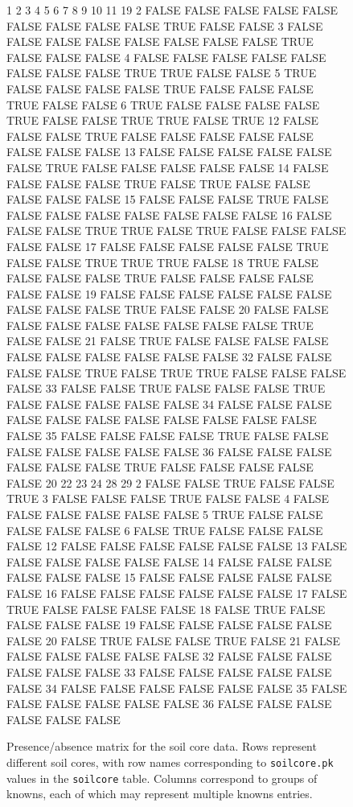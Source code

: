 \documentclass[a4paper]{article}
\newcommand\code\texttt
\begin{document}
\begin{figure}
\begin{Schunk}
\begin{Soutput}
       1     2     3     4     5     6     7     8     9    10    11    19
2  FALSE FALSE FALSE FALSE FALSE FALSE FALSE FALSE FALSE  TRUE FALSE FALSE
3  FALSE FALSE FALSE FALSE FALSE FALSE FALSE FALSE  TRUE FALSE FALSE FALSE
4  FALSE FALSE FALSE FALSE FALSE FALSE FALSE FALSE  TRUE  TRUE FALSE FALSE
5   TRUE FALSE FALSE FALSE FALSE  TRUE FALSE FALSE FALSE  TRUE FALSE FALSE
6   TRUE FALSE FALSE FALSE FALSE  TRUE FALSE FALSE  TRUE  TRUE FALSE  TRUE
12 FALSE FALSE FALSE  TRUE FALSE FALSE FALSE FALSE FALSE FALSE FALSE FALSE
13 FALSE FALSE FALSE FALSE FALSE FALSE  TRUE FALSE FALSE FALSE FALSE FALSE
14 FALSE FALSE FALSE FALSE  TRUE FALSE  TRUE FALSE FALSE FALSE FALSE FALSE
15 FALSE FALSE FALSE  TRUE FALSE FALSE FALSE FALSE FALSE FALSE FALSE FALSE
16 FALSE FALSE FALSE  TRUE  TRUE FALSE  TRUE FALSE FALSE FALSE FALSE FALSE
17 FALSE FALSE FALSE FALSE FALSE  TRUE FALSE FALSE  TRUE  TRUE  TRUE FALSE
18  TRUE FALSE FALSE FALSE FALSE  TRUE FALSE FALSE FALSE FALSE FALSE FALSE
19 FALSE FALSE FALSE FALSE FALSE FALSE FALSE FALSE FALSE  TRUE FALSE FALSE
20 FALSE FALSE FALSE FALSE FALSE FALSE FALSE FALSE FALSE  TRUE FALSE FALSE
21 FALSE  TRUE FALSE FALSE FALSE FALSE FALSE FALSE FALSE FALSE FALSE FALSE
32 FALSE FALSE FALSE FALSE  TRUE FALSE  TRUE  TRUE FALSE FALSE FALSE FALSE
33 FALSE FALSE  TRUE FALSE FALSE FALSE  TRUE FALSE FALSE FALSE FALSE FALSE
34 FALSE FALSE FALSE FALSE FALSE FALSE FALSE FALSE FALSE FALSE FALSE FALSE
35 FALSE FALSE FALSE FALSE  TRUE FALSE FALSE FALSE FALSE FALSE FALSE FALSE
36 FALSE FALSE FALSE FALSE FALSE FALSE  TRUE FALSE FALSE FALSE FALSE FALSE
      20    22    23    24    28    29
2  FALSE FALSE  TRUE FALSE FALSE  TRUE
3  FALSE FALSE FALSE  TRUE FALSE FALSE
4  FALSE FALSE FALSE FALSE FALSE FALSE
5   TRUE FALSE FALSE FALSE FALSE FALSE
6  FALSE  TRUE FALSE FALSE FALSE FALSE
12 FALSE FALSE FALSE FALSE FALSE FALSE
13 FALSE FALSE FALSE FALSE FALSE FALSE
14 FALSE FALSE FALSE FALSE FALSE FALSE
15 FALSE FALSE FALSE FALSE FALSE FALSE
16 FALSE FALSE FALSE FALSE FALSE FALSE
17 FALSE  TRUE FALSE FALSE FALSE FALSE
18 FALSE  TRUE FALSE FALSE FALSE FALSE
19 FALSE FALSE FALSE FALSE FALSE FALSE
20 FALSE  TRUE FALSE FALSE  TRUE FALSE
21 FALSE FALSE FALSE FALSE FALSE FALSE
32 FALSE FALSE FALSE FALSE FALSE FALSE
33 FALSE FALSE FALSE FALSE FALSE FALSE
34 FALSE FALSE FALSE FALSE FALSE FALSE
35 FALSE FALSE FALSE FALSE FALSE FALSE
36 FALSE FALSE FALSE FALSE FALSE FALSE
\end{Soutput}
\end{Schunk}
\caption{Presence/absence matrix for the soil core data.  Rows
  represent different soil cores, with row names corresponding to
  \code{soilcore.pk} values in the \code{soilcore} table.  Columns
  correspond to groups of knowns, each of which may represent multiple
  knowns entries.}
\label{fig:presence-absence-matrix}
\end{figure}
\end{document}
